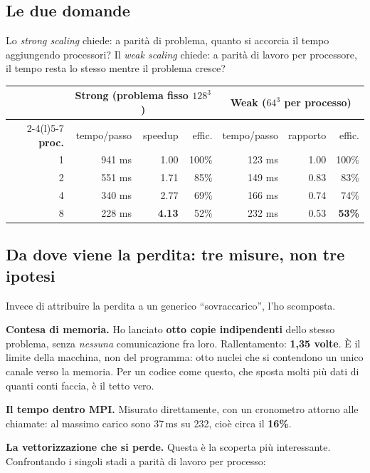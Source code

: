 \documentclass[11pt,a4paper]{article}
\begin{document}
\subsection*{Le due domande}

Lo \emph{strong scaling} chiede: a parità di problema, quanto si accorcia il
tempo aggiungendo processori? Il \emph{weak scaling} chiede: a parità di lavoro
per processore, il tempo resta lo stesso mentre il problema cresce?

\begin{center}
\begin{tabular}{@{}rrrr@{\hskip 2.2em}rrr@{}}
\toprule
& \multicolumn{3}{c}{\textbf{Strong} (problema fisso $128^3$)}
& \multicolumn{3}{c}{\textbf{Weak} ($64^3$ per processo)} \\
\cmidrule(r){2-4}\cmidrule(l){5-7}
\textbf{proc.} & tempo/passo & speedup & effic. & tempo/passo & rapporto & effic. \\
\midrule
1 & 941 ms & 1.00 & 100\% & 123 ms & 1.00 & 100\% \\
2 & 551 ms & 1.71 &  85\% & 149 ms & 0.83 &  83\% \\
4 & 340 ms & 2.77 &  69\% & 166 ms & 0.74 &  74\% \\
8 & 228 ms & \textbf{4.13} & 52\% & 232 ms & 0.53 & \textbf{53\%} \\
\bottomrule
\end{tabular}
\end{center}

\subsection*{Da dove viene la perdita: tre misure, non tre ipotesi}

Invece di attribuire la perdita a un generico ``sovraccarico'', l'ho scomposta.

\textbf{Contesa di memoria.} Ho lanciato \textbf{otto copie indipendenti} dello
stesso problema, senza \emph{nessuna} comunicazione fra loro. Rallentamento:
\textbf{1{,}35 volte}. È il limite della macchina, non del programma: otto
nuclei che si contendono un unico canale verso la memoria. Per un codice come
questo, che sposta molti più dati di quanti conti faccia, è il tetto vero.

\textbf{Il tempo dentro MPI.} Misurato direttamente, con un cronometro attorno
alle chiamate: al massimo carico sono 37\,ms su 232, cioè circa il
\textbf{16\%}.

\textbf{La vettorizzazione che si perde.} Questa è la scoperta più
interessante. Confrontando i singoli stadi a parità di lavoro per processo:
\end{document}
